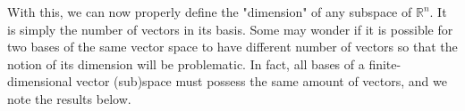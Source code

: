 With this, we can now properly define the "dimension" of any subspace of $\mathbb{R}^n$. It is simply the number of vectors in its basis. Some may wonder if it is possible for two bases of the same vector space to have different number of vectors so that the notion of its dimension will be problematic. In fact, all bases of a finite-dimensional vector (sub)space must possess the same amount of vectors, and we note the results below. %

